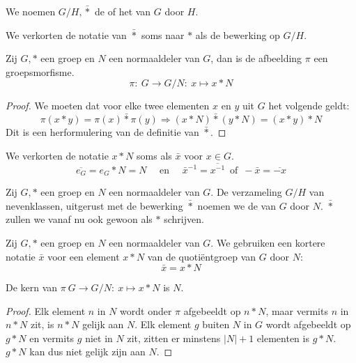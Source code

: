 \documentclass[main.tex]{subfiles}
\begin{document}
\begin{de}
  We noemen $G/H,\bar{*}$ de  of het  van $G$ door $H$.
\end{de}

\begin{de}
  We verkorten de notatie van $\bar{*}$ soms naar $*$ als de bewerking op $G/H$.
\end{de}

\begin{st}
  Zij $G,*$ een groep en $N$ een normaaldeler van $G$, dan is de afbeelding $\pi$ een groepsmorfisme.
  \[ \pi:\ G \rightarrow G/N:\ x \mapsto x*N \]

  \begin{proof}
    We moeten dat voor elke twee elementen $x$ en $y$ uit $G$ het volgende geldt:
    \[ \pi(x*y) = \pi(x) \bar{*} \pi(y) \Rightarrow (x*N)\bar{*}(y*N) = (x*y)*N \]
    Dit is een herformulering van de definitie van $\bar{*}$.
  \end{proof}
\end{st}

\begin{de}
  We verkorten de notatie $x*N$ soms als $\bar{x}$ voor $x\in G$.
  \[ \overline{e_{G}} = e_{G}*N = N \quad\text{ en }\quad \bar{x}^{-1} = \overline{x^{-1}} \,\text{ of }\, -\bar{x} = \overline{-x} \]
\end{de}

\begin{de}
  Zij $G,*$ een groep en $N$ een normaaldeler van $G$.
  De verzameling $G/H$ van nevenklassen, uitgerust met de bewerking $\bar{*}$ noemen we de  van $G$ door $N$.
  $\bar{*}$ zullen we vanaf nu ook gewoon als $*$ schrijven.
\end{de}

\begin{de}
  Zij $G,*$ een groep en $N$ een normaaldeler van $G$.
  We gebruiken een kortere notatie $\bar{x}$ voor een element $x*N$ van de quoti\"entgroep van $G$ door $N$:
  \[ \bar{x} = x*N \]
\end{de}

\begin{ei}
  De kern van $\pi\ G \rightarrow G/N:\ x \mapsto x*N$ is $N$.

  \begin{proof}
    Elk element $n$ in $N$ wordt onder $\pi$ afgebeeldt op $n*N$, maar vermits $n$ in $n*N$ zit, is $n*N$ gelijk aan $N$.
    Elk element $g$ buiten $N$ in $G$ wordt afgebeeldt op $g*N$ en vermits $g$ niet in $N$ zit, zitten er minstens $|N|+1$ elementen is $g*N$. $g*N$ kan dus niet gelijk zijn aan $N$.
  \end{proof}
\end{ei}
\end{document}
